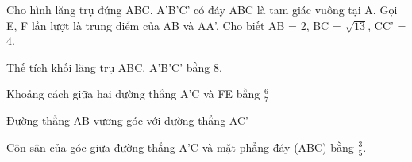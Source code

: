 \begin{question}[type=true_false,difficulty=3,code={II-2}]
Cho hình lăng trụ đứng ABC. A'B'C' có đáy ABC là tam giác vuông tại A. Gọi E, F lần lượt là trung điểm của AB và AA'. Cho biết AB = 2, BC = $ \sqrt{13} $, CC' = 4.

\begin{statement}[correct=false,label=a]
Thế tích khối lăng trụ ABC. A'B'C' bằng 8.
\end{statement}

\begin{statement}[correct=false,label=b]
Khoảng cách giữa hai đường thẳng A'C và FE bằng $ \frac{6}{7} $
\end{statement}

\begin{statement}[correct=true,label=c]
Đường thẳng AB vương góc với đường thẳng AC'
\end{statement}

\begin{statement}[correct=true,label=d]
Côn sân của góc giữa đường thẳng A'C và mặt phẳng đáy (ABC) bằng $ \frac{3}{5} $.
\end{statement}

\end{question}
